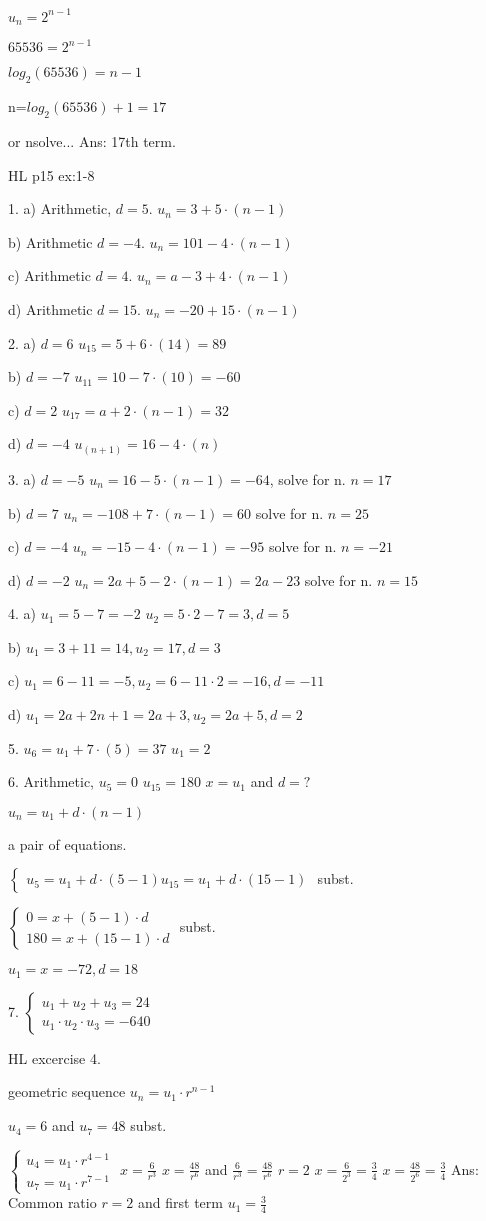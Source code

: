 $u_n=2^{n-1}$ 

$65536=2^{n-1}$

$log_2(65536)=n-1$ 

n=$log_2(65536)+1=17$

or nsolve... Ans: 17th term. 

HL p15 ex:1-8 

1. a) Arithmetic, $d=5$. 
$u_n=3+5\cdot (n-1)$

b) Arithmetic $d=-4$. 
$u_n=101-4\cdot(n-1)$ 

c) Arithmetic $d=4$. 
$u_n=a-3+4\cdot(n-1)$

d) Arithmetic $d=15$. 
$u_n=-20+15\cdot (n-1)$

2. a) $d=6$
$u_15=5+6\cdot(14)=89$

b) $d=-7$
$u_11=10-7\cdot(10)=-60$

c) $d=2$
$u_17=a+2\cdot(n-1)=32$

d) $d=-4$
$u_{(n+1)}=16-4\cdot(n)$

3. a) $d=-5$
$u_n=16-5\cdot(n-1)=-64$, solve for n.
$n=17$

b) $d=7$
$u_n=-108+7\cdot(n-1)=60$ solve for n.
$n=25$

c) $d=-4$
$u_n=-15-4\cdot(n-1)=-95$ solve for n.
$n=-21$

d) $d=-2$
$u_n=2a+5-2\cdot(n-1)=2a-23$ solve for n.
$n=15$

4. a) $u_1=5-7=-2$ $u_2=5\cdot2-7=3, d=5$

b) $u_1=3+11=14, u_2=17 ,d=3$

c) $u_1=6-11=-5, u_2=6-11\cdot2=-16, d=-11$

d) $u_1=2a+2n+1=2a+3, u_2=2a+5, d=2$

5. $u_6=u_1+7\cdot(5)=37$
$u_1=2$

6. Arithmetic, $u_5=0$ $u_15=180$
$x=u_1$ and $d=?$

$u_n=u_1+d\cdot(n-1)$

a pair of equations. 

$\begin{cases}
u_5=u_1+d\cdot(5-1)
u_15=u_1+d\cdot(15-1)
\end{cases}$ subst.

$\begin{cases}
0=x+(5-1)\cdot d\\ 
180=x+(15-1)\cdot d
\end{cases}$ subst.

$u_1=x=-72, d=18$

7. $\begin{cases}
u_1+u_2+u_3=24 \\
u_1\cdot u_2\cdot u_3=-640
\end{cases}$

HL excercise 4. 

geometric sequence $u_n=u_1\cdot r^{n-1}$

$u_4=6$ and $u_7=48$ subst. 

$\begin{cases}
u_4=u_1\cdot r^{4-1} \\
u_7=u_1\cdot r^{7-1}
\end{cases}$
$x=\frac{6}{r^3}$
$x=\frac{48}{r^6}$ and $\frac{6}{r^3}=\frac{48}{r^6}$
$r=2$
$x=\frac{6}{2^3}=\frac{3}{4}$
$x=\frac{48}{2^6}=\frac{3}{4}$
Ans: Common ratio $r=2$ and first term $u_1=\frac{3}{4}$

